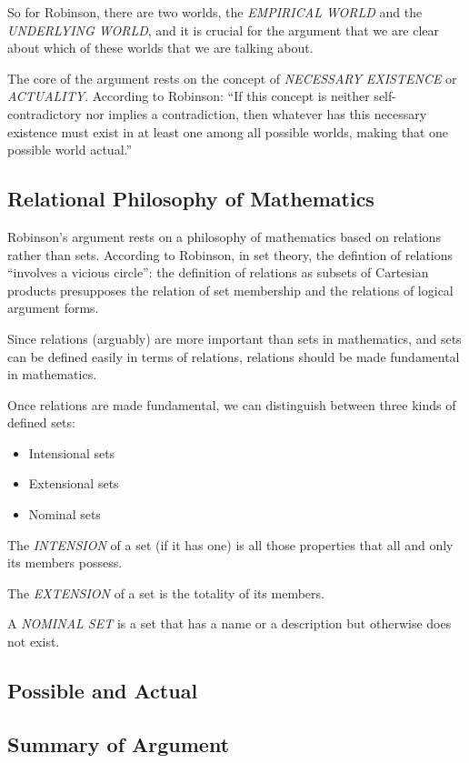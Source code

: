 \documentclass[11pt]{article}
\begin{document}
So for Robinson, there are two worlds, the \emph{EMPIRICAL WORLD} and 
the \emph{UNDERLYING WORLD}, and it is crucial for the argument that 
we are clear about which of these worlds that we are talking about.

The core of the argument rests on the concept of \emph{NECESSARY EXISTENCE}
or \emph{ACTUALITY}. According to Robinson: ``If this concept is neither 
self-contradictory nor implies a contradiction, then whatever has
this necessary existence must exist in at least one among all 
possible worlds, making that one possible world actual.''

\subsection{Relational Philosophy of Mathematics}
\label{sec-1.3}

Robinson's argument rests on a philosophy of mathematics
based on relations rather than sets. According to Robinson,
in set theory, the defintion of relations ``involves a 
vicious circle'': the definition of relations as subsets
of Cartesian products presupposes the relation of set
membership and the relations of logical argument forms.

Since relations (arguably) are more important than sets
in mathematics, and sets can be defined easily in terms
of relations, relations should be made fundamental in
mathematics.

Once relations are made fundamental, we can distinguish
between three kinds of defined sets:

\begin{itemize}
\item Intensional sets
\item Extensional sets
\item Nominal sets
\end{itemize}
The \emph{INTENSION} of a set (if it has one) is all those properties
that all and only its members possess.

The \emph{EXTENSION} of a set is the totality of its members.

A \emph{NOMINAL SET} is a set that has a name or a description but
otherwise does not exist.

\subsection{Possible and Actual}
\label{sec-1.4}

\subsection{Summary of Argument}
\label{sec-1.5}
\end{document}
